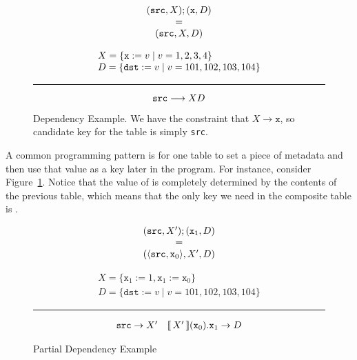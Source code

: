 \begin{figure}[ptb]
  \begin{minipage}{.33\columnwidth}
  \[\begin{array}{c}
      (\texttt{src}, X);
      (\texttt{x}, D)
      \\ = \\
      (\texttt{src}, X, D)
    \end{array}\]
\end{minipage}\hfill\vrule\hfill\begin{minipage}{.66\columnwidth}
  \[\begin{array}l
      X = \{\var x:=v \mid v = 1,2,3,4\}\\
      D = \{\var{dst} := v \mid v = 101,102,103,104\} \\
    \end{array}
  \]
  \hrule
  \[\texttt{src}\longrightarrow XD\]
\end{minipage}

\caption{Dependency Example. We have the constraint that
  $X \longrightarrow \texttt{x}$, so candidate key for the table is
  simply \texttt{src}.}
  \label{fig:dependency-ex}
\end{figure}

A common programming pattern is for one table to set a piece of
metadata and then use that value as a key later in the program. For
instance, consider Figure~\ref{fig:dependency-ex}. Notice that the
value of  is completely determined by the contents of the
previous table, which means that the only key we need in the composite
table is .

\begin{figure}
  \begin{minipage}{0.33\columnwidth}
  \[\begin{array}c
      (\texttt{src}, X');(\texttt{x}_1,D)
      \\ = \\
      (\langle\texttt{src},\texttt{x}_0\rangle, X', D)
    \end{array}
  \]
\end{minipage}\hfill \vline \hfill\begin{minipage}{0.66\columnwidth}
  \[\begin{array}{l}
      X = \{\texttt{x}_1:=1, \texttt{x}_1:=\texttt{x}_0\}\\
      D = \{\texttt{dst} := v \mid v = 101,102,103,104\}
    \end{array}
  \]
  \hrule\[\begin{array}{cc}
      \texttt{src} \to X'
      & \llbracket\,X'\,\rrbracket(\texttt{x}_0).\texttt{x}_1 \to D
    \end{array}\]
\end{minipage}
  \caption{Partial Dependency Example}
  \label{fig:partial-depend-ex}      
\end{figure}

